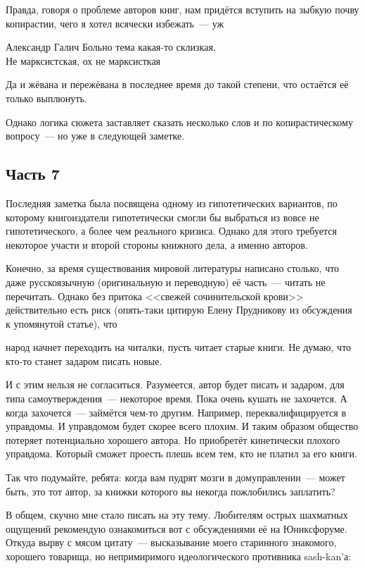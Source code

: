 Правда, говоря о проблеме авторов книг, нам придётся вступить на зыбкую почву копирастии, чего я хотел всячески избежать~--- уж

\begin{shadequote}[r]{Александр Галич}
Больно тема какая-то склизкая, \\
Не марксистская, ох не марксисткая 
\end{shadequote}

Да и жёвана и пережёвана в последнее время до такой степени, что остаётся её только выплюнуть.

Однако логика сюжета заставляет сказать несколько слов и по копирастическому вопросу~--- но уже в следующей заметке.

\subsection{Часть 7}
Последняя заметка была посвящена одному из гипотетических вариантов, по которому книгоиздатели гипотетически смогли бы выбраться из вовсе не гипотетического, а более чем реального кризиса. Однако для этого требуется некоторое участи и второй стороны книжного дела, а именно авторов.

Конечно, за время существования мировой литературы написано столько, что даже русскоязычную (оригинальную и переводную) её часть~--- читать не перечитать. Однако без притока <<свежей сочинительской крови>> действительно есть риск (опять-таки цитирую Елену Прудникову из обсуждения к упомянутой статье), что


\begin{shadequote}{}
народ начнет переходить на читалки, пусть читает старые книги. Не думаю, что кто-то станет задаром писать новые.
\end{shadequote}

И с этим нельзя не согласиться. Разумеется, автор будет писать и задаром, для типа самоутверждения~--- некоторое время. Пока очень кушать не захочется. А когда захочется~--- займётся чем-то другим. Например, переквалифицируется в управдомы. И управдомом будет скорее всего плохим. И таким образом общество потеряет потенциально хорошего автора. Но приобретёт кинетически плохого управдома. Который сможет проесть плешь всем тем, кто не платил за его книги.

Так что подумайте, ребята: когда вам пудрят мозги в домуправлении~--- может быть, это тот автор, за книжки которого вы некогда пожлобились заплатить?

В общем, скучно мне стало писать на эту тему. Любителям острых шахматных ощущений рекомендую ознакомиться вот с обсуждениями её на Юниксфоруме. Откуда вырву с мясом цитату~--- высказывание моего старинного знакомого, хорошего товарища, но непримиримого идеологического противника sash-kan'а:


